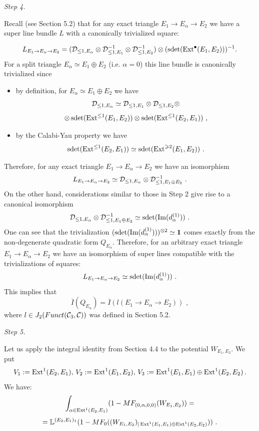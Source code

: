 \documentclass[12pt]{article}
\begin{document}
{\it Step 4.}

Recall (see Section 5.2) that for any exact triangle $E_1\to E_{\alpha}\to E_2$ we have a super line bundle $L$ with a canonically trivialized square:

$$L_{E_1\to E_{\alpha}\to E_2}=({\cal D}_{{\le 1},E_{\alpha}}\otimes {\cal D}_{{\le 1},E_1}^{-1}\otimes {\cal D}_{{\le 1},E_2}^{-1})\otimes (\operatorname{sdet}(\operatorname{Ext}^{\bullet}(E_1,E_2)))^{-1}.$$
For a split triangle $E_{\alpha}\simeq E_1\oplus E_2$ (i.e. $\alpha=0$) this line bundle is canonically trivialized since
\begin{itemize}
\item by definition, for $E_{\alpha}\simeq E_1\oplus E_2$ we have
$${\cal D}_{\le 1,E_{\alpha}}\simeq {\cal D}_{\le 1,E_{1}}\otimes {\cal D}_{\le 1,E_{2}}\otimes $$
$$\otimes\operatorname{sdet}(\operatorname{Ext}^{\le 1}(E_1,E_2))\otimes \operatorname{sdet}(\operatorname{Ext}^{\le 1}(E_2,E_1))\,\,,$$
\item by the Calabi-Yau property we have 
$$\operatorname{sdet}(\operatorname{Ext}^{\le 1}(E_2,E_1))\simeq \operatorname{sdet}(\operatorname{Ext}^{\geqslant 2}(E_1,E_2))\,\,.$$
\end{itemize}
Therefore, for any exact triangle $E_1\to E_{\alpha}\to E_2$ we have an isomorphism
$$L_{E_1\to E_{\alpha}\to E_2}\simeq {\cal D}_{\le 1,E_{\alpha}}\otimes {\cal D}_{\le 1,E_{1}\oplus E_2}^{-1}\,\,.$$
On the other hand, considerations similar to those in Step 2 give rise to a canonical isomorphism 
$${\cal D}_{\le 1,E_{\alpha}}\otimes {\cal D}_{\le 1,E_{1}\oplus E_2}^{-1}\simeq \operatorname{sdet}(\operatorname{Im}(d_{\alpha}^{(1)}))\,\,.$$
One can see that the trivialization $(\operatorname{sdet}(\operatorname{Im}(d_{\alpha}^{(1)})))^{\otimes 2}\simeq {\bf 1}$ comes exactly 
from the non-degenerate quadratic form $Q_{E_{\alpha}}$.
Therefore, for an arbitrary exact triangle $E_1\to E_{\alpha}\to E_2$ we have an isomorphism of super lines compatible
 with the trivializations of squares: 
$$L_{E_1\to E_{\alpha}\to E_2}\simeq \operatorname{sdet}(\operatorname{Im}(d_{\alpha}^{(1)}))\,\,.$$
This implies that
$$\overline{I}(Q_{E_{\alpha}})=\overline{I}(l(E_1\to E_{\alpha}\to E_2))\,\,,$$
where $l\in J_2(Funct({{\mathcal C}}_3, {\mathcal C}))$ was defined in Section 5.2.

















{\it Step 5.}

Let us apply the integral identity from Section 4.4 to the potential $W_{E_1,E_2}$. 
We put
$$V_1:=\operatorname{Ext}^1(E_2,E_1),\,V_2:=\operatorname{Ext}^1(E_1,E_2),\,V_3:=\operatorname{Ext}^1(E_1,E_1)\oplus\operatorname{Ext}^1(E_2,E_2)\,.  $$
We  have:
$$\int_{\alpha\in \operatorname{Ext}^1(E_2,E_1)}(1-MF_{(0,\alpha,0,0)}(W_{E_1,E_2}))=$$ $$=
{\mathbb L}^{(E_2,E_1)_1}(1-MF_0((W_{E_1,E_2})_{|\operatorname{Ext}^1(E_1,E_1)\oplus \operatorname{Ext}^1(E_2,E_2)}))\,\,.$$
\end{document}
